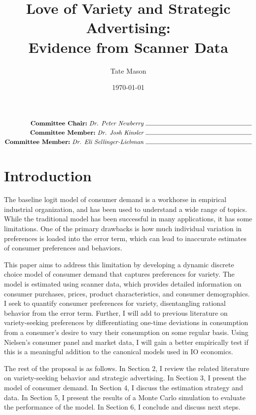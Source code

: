 \documentclass[12pt]{article}
\title{\textbf{Love of Variety and Strategic Advertising:\\
               Evidence from Scanner Data}}
\author[1]{Tate Mason}
\affil[1]{John Munro Godfrey Sr. Department of Economics, University of Georgia}
\date{\today}
\begin{document}
\maketitle

\begin{align*}
  \textbf{Committee Chair:} \ \textit{Dr. Peter Newberry} \ &\rule{6cm}{0.4pt}\\
  \textbf{Committee Member:}\  \textit{Dr. Josh Kinsler} \ &\rule{6cm}{0.4pt} \\
  \textbf{Committee Member:}\  \textit{Dr. Eli Sellinger-Liebman} \ &\rule{6cm}{0.4pt}\\
\end{align*}

\newpage

\section{Introduction}

The baseline logit model of consumer demand is a workhorse in empirical industrial organization, and has been used to understand a wide range of topics. While the traditional model has been successful in many applications, it has some limitations. One of the primary drawbacks is how much individual variation in preferences is loaded into the error term, which can lead to inaccurate estimates of consumer preferences and behaviors.

This paper aims to address this limitation by developing a dynamic discrete choice model of consumer demand that captures preferences for variety. The model is estimated using scanner data, which provides detailed information on consumer purchases, prices, product characteristics, and consumer demographics. I seek to quantify consumer preferences for variety, disentangling rational behavior from the error term. Further, I will add to previous literature on variety-seeking preferences by differentiating one-time deviations in consumption from a consumer's desire to vary their consumption on some regular basis. Using Nielsen's consumer panel and market data, I will gain a better empirically test if this is a meaningful addition to the canonical models used in IO economics. 

The rest of the proposal is as follows. In Section 2, I review the related literature on variety-seeking behavior and strategic advertising. In Section 3, I present the model of consumer demand. In Section 4, I discuss the estimation strategy and data. In Section 5, I present the results of a Monte Carlo simulation to evaluate the performance of the model. In Section 6, I conclude and discuss next steps.
\end{document}
